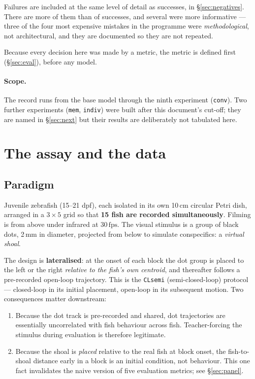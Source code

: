 \documentclass[11pt,a4paper]{article}
\newcommand{\uu}[1]{\ensuremath{\,\mathrm{#1}}}  %
\newcommand{\code}[1]{\texttt{\small #1}}
\begin{document}
Failures are included at the same level of detail as successes, in
\S\ref{sec:negatives}. There are more of them than of successes, and several were more
informative --- three of the four most expensive mistakes in the programme were
\emph{methodological}, not architectural, and they are documented so they are not
repeated.

Because every decision here was made by a metric, the metric is defined first
(\S\ref{sec:eval}), before any model.

\paragraph{Scope.} The record runs from the base model through the ninth experiment
(\code{conv}). Two further experiments (\code{mem}, \code{indiv}) were built after this
document's cut-off; they are named in \S\ref{sec:next} but their results are deliberately
not tabulated here.

\section{The assay and the data}\label{sec:assay}

\subsection{Paradigm}

Juvenile zebrafish (15--21 dpf), each isolated in its own 10\uu{cm} circular
Petri dish, arranged in a $3\times5$ grid so that \textbf{15 fish are recorded
simultaneously}. Filming is from above under infrared at 30\uu{fps}. The visual
stimulus is a group of black dots, 2\uu{mm} in diameter, projected from below
to simulate conspecifics: a \emph{virtual shoal}.

The design is \textbf{lateralised}: at the onset of each block the dot group is placed to
the left or the right \emph{relative to the fish's own centroid}, and thereafter follows a
pre-recorded open-loop trajectory. This is the \code{CLsemi} (semi-closed-loop)
protocol --- closed-loop in its initial placement, open-loop in its subsequent motion.
Two consequences matter downstream:

\begin{enumerate}\itemsep2pt
\item Because the dot track is pre-recorded and shared, dot trajectories are essentially
      uncorrelated with fish behaviour across fish. Teacher-forcing the stimulus during
      evaluation is therefore legitimate.
\item Because the shoal is \emph{placed} relative to the real fish at block onset, the
      fish-to-shoal distance early in a block is an initial condition, not behaviour.
      This one fact invalidates the naive version of five evaluation metrics; see
      \S\ref{sec:panel}.
\end{enumerate}
\end{document}

